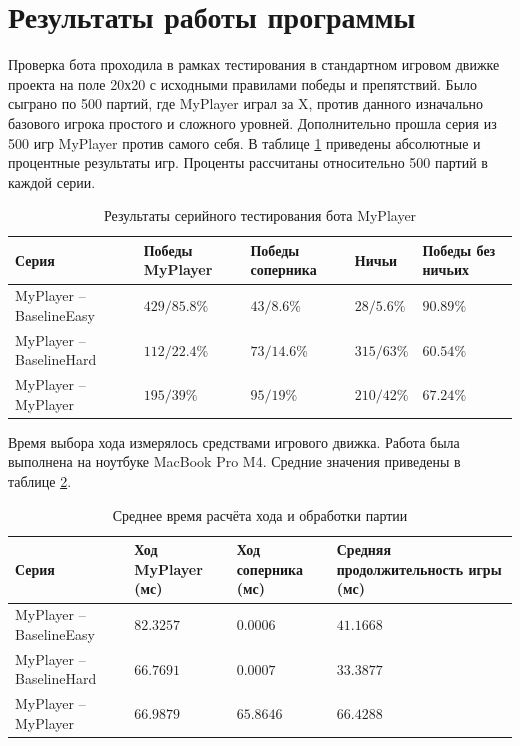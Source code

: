 \documentclass[14pt]{extreport}
\begin{document}
\newpage
\section{Результаты работы программы}
Проверка бота проходила в рамках тестирования в стандартном игровом движке проекта на поле 20х20 с исходными правилами победы и препятствий. Было сыграно по 500 партий, где MyPlayer играл за X, против данного изначально базового игрока простого и сложного уровней. Дополнительно прошла серия из 500 игр MyPlayer против самого себя.
В таблице \ref{tab2} приведены абсолютные и процентные результаты игр. Проценты рассчитаны относительно 500 партий в каждой серии.
\begin{table}[h]
\centering
\renewcommand{\tablename}{\small{Таблица.}}
\caption{\small Результаты серийного тестирования бота MyPlayer}
\label{tab2}
\begin{footnotesize}
    \begin{tabular}{|p{5cm}|p{2cm}|p{2cm}|p{2cm}|p{2cm}|}
    \hline
    Серия & Победы MyPlayer & Победы соперника & Ничьи & Победы без ничьих \\
    \hline
    MyPlayer -- BaselineEasy & $429 / 85.8 \%$ & $43 / 8.6 \%$ & $28 / 5.6 \%$ & $90.89 \%$ \\
    \hline
    MyPlayer -- BaselineHard & $112 / 22.4 \%$ & $73 / 14.6 \%$ & $315 / 63 \%$ & $60.54 \%$ \\
    \hline
    MyPlayer -- MyPlayer & $195 / 39 \%$ & $95 / 19 \%$ & $210 / 42 \%$ & $67.24 \%$ \\
    \hline
    \end{tabular}
\end{footnotesize}
\end{table}

Время выбора хода измерялось средствами игрового движка. Работа была выполнена на ноутбуке MacBook Pro M4. Средние значения приведены в таблице \ref{tab3}.
\begin{table}[h]
\centering
\renewcommand{\tablename}{\small{Таблица.}}
\caption{\small Среднее время расчёта хода и обработки партии}
\label{tab3}
\begin{footnotesize}
    \begin{tabular}{|p{5cm}|p{3cm}|p{3cm}|p{3cm}|}
    \hline
    Серия & Ход MyPlayer (мс) & Ход соперника (мс) & Средняя продолжительность игры (мс) \\
    \hline
    MyPlayer -- BaselineEasy & $82.3257$ & $0.0006$ & $41.1668$ \\
    \hline
    MyPlayer -- BaselineHard & $66.7691$ & $0.0007$ & $33.3877$ \\
    \hline
    MyPlayer -- MyPlayer & $66.9879$ & $65.8646$ & $66.4288$ \\
    \hline
    \end{tabular}
\end{footnotesize}
\end{table}
\end{document}

